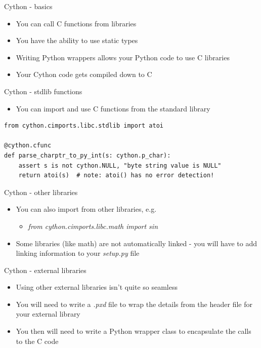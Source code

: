 \documentclass[presentation]{beamer}
\begin{document}
\begin{frame}[label=cython---basics]{Cython - basics}
\begin{itemize}
\item You can call C functions from libraries
\item You have the ability to use static types
\item Writing Python wrappers allows your Python code to use C libraries
\item Your Cython code gets compiled down to C
\end{itemize}
\end{frame}
\begin{frame}[label=cython---stdlib-functions,fragile]{Cython - stdlib functions}
 \begin{itemize}
\item You can import and use C functions from the standard library
\end{itemize}

\begin{verbatim}
from cython.cimports.libc.stdlib import atoi

@cython.cfunc
def parse_charptr_to_py_int(s: cython.p_char):
    assert s is not cython.NULL, "byte string value is NULL"
    return atoi(s)  # note: atoi() has no error detection!
\end{verbatim}
\end{frame}
\begin{frame}[label=cython---other-libraries]{Cython - other libraries}
\begin{itemize}
\item You can also import from other libraries, e.g.
\begin{itemize}
\item \alert{\emph{from cython.cimports.libc.math import sin}}
\end{itemize}
\item Some libraries (like math) are not automatically linked - you will
have to add linking information to your \alert{\emph{setup.py}} file
\end{itemize}
\end{frame}
\begin{frame}[label=cython---external-libraries]{Cython - external libraries}
\begin{itemize}
\item Using other external libraries isn't quite so seamless
\item You will need to write a \alert{\emph{.pxd}} file to wrap the details from the
header file for your external library
\item You then will need to write a Python wrapper class to encapsulate the
calls to the C code
\end{itemize}
\end{frame}
\end{document}
